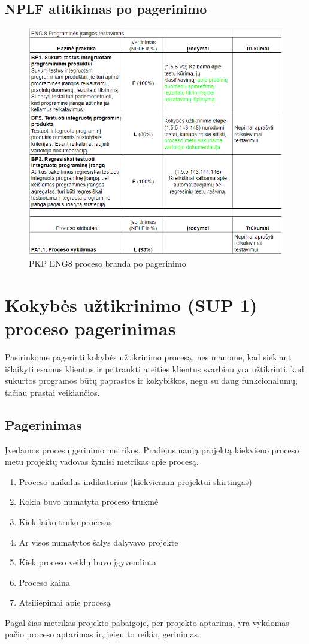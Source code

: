 \documentclass{VUMIFPSkursinis}
\begin{document}
	\subsection{NPLF atitikimas po pagerinimo}
	\begin{figure}[htbp]
		\includegraphics[scale=0.9]{img/eng8_po_pakeitimo}
		\caption{PKP ENG8 proceso branda po pagerinimo} %
		\label{img:pkpPries}
	\end{figure}
	
\section{Kokybės užtikrinimo (SUP 1) proceso pagerinimas}
	Pasirinkome pagerinti kokybės užtikrinimo procesą, nes manome, kad siekiant išlaikyti esamus klientus ir pritraukti ateities klientus svarbiau yra užtikrinti, 
	kad sukurtos programos būtų paprastos ir kokybiškos, negu su daug funkcionalumų, tačiau prastai veikiančios.

			\subsection{Pagerinimas}
				Įvedamos procesų gerinimo metrikos.
				Pradėjus naują projektą kiekvieno proceso metu projektų vadovas žymisi metrikas apie procesą.
					\begin{enumerate}
						\item{Proceso unikalus indikatorius (kiekvienam projektui skirtingas)}
						\item{Kokia buvo numatyta proceso trukmė}
						\item{Kiek laiko truko procesas}
						\item{Ar visos numatytos šalys dalyvavo projekte}
						\item{Kiek proceso veiklų buvo įgyvendinta}
						\item{Proceso kaina}
						\item{Atsiliepimai apie procesą}
					\end{enumerate}
				Pagal šias metrikas projekto pabaigoje, per projekto aptarimą, yra vykdomas pačio proceso aptarimas ir, jeigu to reikia, gerinimas.
\end{document}
